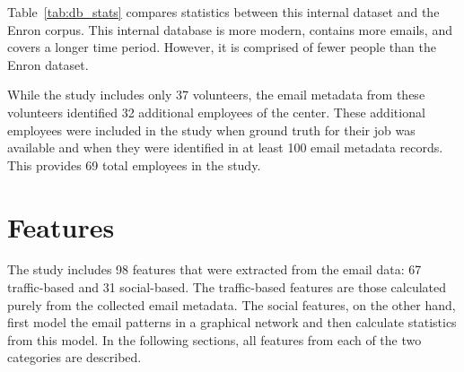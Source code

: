 \documentclass{article}
\begin{document}
Table~\ref{tab:db_stats} compares statistics between this internal dataset and the Enron corpus.  This internal database is more modern, contains more emails, and covers a longer time period.  However, it is comprised of fewer people than the Enron dataset.

\begin{table}[H]
\centering
\caption{A comparison between the internal dataset and the Enron email corpus.}
\label{tab:db_stats}
\end{table}

While the study includes only 37 volunteers, the email metadata from these volunteers identified 32 additional employees of the center.  These additional employees were included in the study when ground truth for their job was available and when they were identified in at least 100 email metadata records.  This provides 69 total employees in the study.

\section{Features} \label{Features}
The study includes 98 features that were extracted from the email data: 67 traffic-based and 31 social-based.  The traffic-based features are those calculated purely from the collected email metadata.  The social features, on the other hand, first model the email patterns in a graphical network and then calculate statistics from this model.  In the following sections, all features from each of the two categories are described. 
\end{document}
